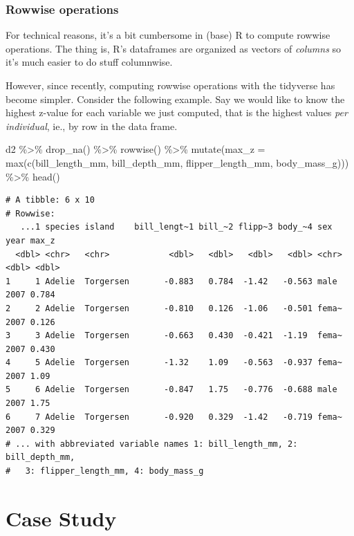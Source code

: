 \documentclass[
  letterpaper,
  DIV=11,
  numbers=noendperiod]{scrreprt}
\newenvironment{Shaded}{\begin{snugshade}}{\end{snugshade}}
\newcommand{\AttributeTok}[1]{\textcolor[rgb]{0.40,0.45,0.13}{#1}}
\newcommand{\FunctionTok}[1]{\textcolor[rgb]{0.28,0.35,0.67}{#1}}
\newcommand{\NormalTok}[1]{\textcolor[rgb]{0.00,0.23,0.31}{#1}}
\newcommand{\SpecialCharTok}[1]{\textcolor[rgb]{0.37,0.37,0.37}{#1}}
\theoremstyle{definition}
\theoremstyle{definition}
\theoremstyle{remark}
\begin{document}
\hypertarget{rowwise-operations}{%
\subsubsection{Rowwise operations}\label{rowwise-operations}}

For technical reasons, it's a bit cumbersome in (base) R to compute
rowwise operations. The thing is, R's dataframes are organized as
vectors of \emph{columns} so it's much easier to do stuff columnwise.

However, since recently, computing rowwise operations with the tidyverse
has become simpler. Consider the following example. Say we would like to
know the highest z-value for each variable we just computed, that is the
highest values \emph{per individual}, ie., by row in the data frame.

\begin{Shaded}
\begin{Highlighting}[]
\NormalTok{d2 }\SpecialCharTok{\%\textgreater{}\%} 
  \FunctionTok{drop\_na}\NormalTok{() }\SpecialCharTok{\%\textgreater{}\%} 
  \FunctionTok{rowwise}\NormalTok{() }\SpecialCharTok{\%\textgreater{}\%} 
  \FunctionTok{mutate}\NormalTok{(}\AttributeTok{max\_z =} \FunctionTok{max}\NormalTok{(}\FunctionTok{c}\NormalTok{(bill\_length\_mm, bill\_depth\_mm, flipper\_length\_mm, body\_mass\_g))) }\SpecialCharTok{\%\textgreater{}\%} 
  \FunctionTok{head}\NormalTok{()}
\end{Highlighting}
\end{Shaded}

\begin{verbatim}
# A tibble: 6 x 10
# Rowwise: 
   ...1 species island    bill_lengt~1 bill_~2 flipp~3 body_~4 sex    year max_z
  <dbl> <chr>   <chr>            <dbl>   <dbl>   <dbl>   <dbl> <chr> <dbl> <dbl>
1     1 Adelie  Torgersen       -0.883   0.784  -1.42   -0.563 male   2007 0.784
2     2 Adelie  Torgersen       -0.810   0.126  -1.06   -0.501 fema~  2007 0.126
3     3 Adelie  Torgersen       -0.663   0.430  -0.421  -1.19  fema~  2007 0.430
4     5 Adelie  Torgersen       -1.32    1.09   -0.563  -0.937 fema~  2007 1.09 
5     6 Adelie  Torgersen       -0.847   1.75   -0.776  -0.688 male   2007 1.75 
6     7 Adelie  Torgersen       -0.920   0.329  -1.42   -0.719 fema~  2007 0.329
# ... with abbreviated variable names 1: bill_length_mm, 2: bill_depth_mm,
#   3: flipper_length_mm, 4: body_mass_g
\end{verbatim}

\hypertarget{case-study-2}{%
\section{Case Study}\label{case-study-2}}
\end{document}
